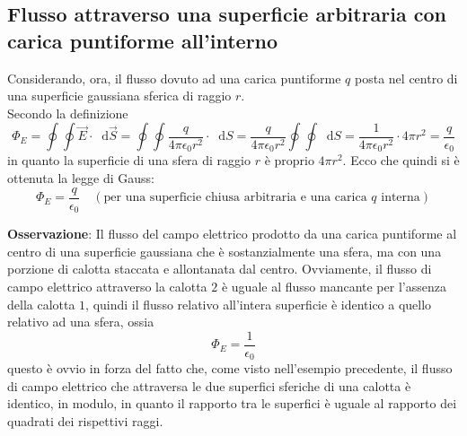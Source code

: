 \documentclass[a4paper]{extarticle}
\newcommand\dif{\mathop{}\!\mathrm{d}}
\begin{document}
\vspace{1em}
\noindent
\subsection{Flusso attraverso una superficie arbitraria con carica puntiforme all'interno}
Considerando, ora, il flusso dovuto ad una carica puntiforme $q$ posta nel centro di una superficie gaussiana sferica di raggio $r$.\\
Secondo la definizione
\[\Phi_E = \oint \oint \vec E \cdot \dif \vec S = \oint \oint \frac{q}{4 \pi \epsilon_0 r^2} \cdot \dif S = \frac{q}{4 \pi \epsilon_0 r^2} \oint \oint \dif S = \frac{1}{4 \pi \epsilon_0 r^2} \cdot 4 \pi r^2 = \frac{q}{\epsilon_0}\]
in quanto la superficie di una sfera di raggio $r$ è proprio $4 \pi r^2$. Ecco che quindi si è ottenuta la legge di Gauss:
\[\boxed{\Phi_E = \frac{q}{\epsilon_0} \hspace{1em} (\text{per una superficie chiusa arbitraria e una carica } q \text{ interna})}\]

\vspace{1em}
\noindent
\textbf{Osservazione}: Il flusso del campo elettrico prodotto da una carica puntiforme al centro di una superficie gaussiana che è sostanzialmente una sfera, ma con una porzione di calotta staccata e allontanata dal centro. Ovviamente, il flusso di campo elettrico attraverso la calotta $2$ è uguale al flusso mancante per l'assenza della calotta $1$, quindi il flusso relativo all'intera superficie è identico a quello relativo ad una sfera, ossia
\[\Phi_E = \frac{1}{\epsilon_0}\]
questo è ovvio in forza del fatto che, come visto nell'esempio precedente, il flusso di campo elettrico che attraversa le due superfici sferiche di una calotta è identico, in modulo, in quanto il rapporto tra le superfici è uguale al rapporto dei quadrati dei rispettivi raggi.

\vspace{1em}
\noindent
\end{document}
